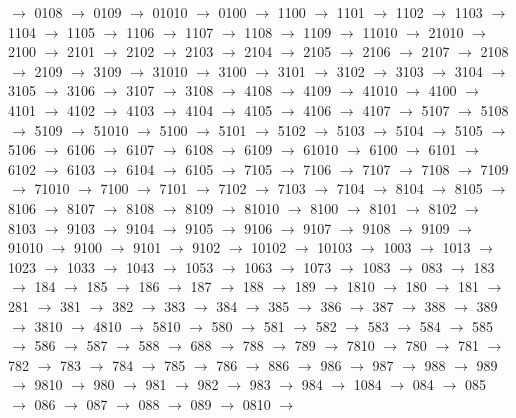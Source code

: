 $\rightarrow$ 0108 $\rightarrow$ 0109 $\rightarrow$ 01010 $\rightarrow$ 0100 $\rightarrow$ 1100 $\rightarrow$ 1101 $\rightarrow$ 1102 $\rightarrow$ 1103 $\rightarrow$ 1104 $\rightarrow$ 1105 $\rightarrow$ 1106 $\rightarrow$ 1107 $\rightarrow$ 1108 $\rightarrow$ 1109 $\rightarrow$ 11010 $\rightarrow$ 21010 $\rightarrow$ 2100 $\rightarrow$ 2101 $\rightarrow$ 2102 $\rightarrow$ 2103 $\rightarrow$ 2104 $\rightarrow$ 2105 $\rightarrow$ 2106 $\rightarrow$ 2107 $\rightarrow$ 2108 $\rightarrow$ 2109 $\rightarrow$ 3109 $\rightarrow$ 31010 $\rightarrow$ 3100 $\rightarrow$ 3101 $\rightarrow$ 3102 $\rightarrow$ 3103 $\rightarrow$ 3104 $\rightarrow$ 3105 $\rightarrow$ 3106 $\rightarrow$ 3107 $\rightarrow$ 3108 $\rightarrow$ 4108 $\rightarrow$ 4109 $\rightarrow$ 41010 $\rightarrow$ 4100 $\rightarrow$ 4101 $\rightarrow$ 4102 $\rightarrow$ 4103 $\rightarrow$ 4104 $\rightarrow$ 4105 $\rightarrow$ 4106 $\rightarrow$ 4107 $\rightarrow$ 5107 $\rightarrow$ 5108 $\rightarrow$ 5109 $\rightarrow$ 51010 $\rightarrow$ 5100 $\rightarrow$ 5101 $\rightarrow$ 5102 $\rightarrow$ 5103 $\rightarrow$ 5104 $\rightarrow$ 5105 $\rightarrow$ 5106 $\rightarrow$ 6106 $\rightarrow$ 6107 $\rightarrow$ 6108 $\rightarrow$ 6109 $\rightarrow$ 61010 $\rightarrow$ 6100 $\rightarrow$ 6101 $\rightarrow$ 6102 $\rightarrow$ 6103 $\rightarrow$ 6104 $\rightarrow$ 6105 $\rightarrow$ 7105 $\rightarrow$ 7106 $\rightarrow$ 7107 $\rightarrow$ 7108 $\rightarrow$ 7109 $\rightarrow$ 71010 $\rightarrow$ 7100 $\rightarrow$ 7101 $\rightarrow$ 7102 $\rightarrow$ 7103 $\rightarrow$ 7104 $\rightarrow$ 8104 $\rightarrow$ 8105 $\rightarrow$ 8106 $\rightarrow$ 8107 $\rightarrow$ 8108 $\rightarrow$ 8109 $\rightarrow$ 81010 $\rightarrow$ 8100 $\rightarrow$ 8101 $\rightarrow$ 8102 $\rightarrow$ 8103 $\rightarrow$ 9103 $\rightarrow$ 9104 $\rightarrow$ 9105 $\rightarrow$ 9106 $\rightarrow$ 9107 $\rightarrow$ 9108 $\rightarrow$ 9109 $\rightarrow$ 91010 $\rightarrow$ 9100 $\rightarrow$ 9101 $\rightarrow$ 9102 $\rightarrow$ 10102 $\rightarrow$ 10103 $\rightarrow$ 1003 $\rightarrow$ 1013 $\rightarrow$ 1023 $\rightarrow$ 1033 $\rightarrow$ 1043 $\rightarrow$ 1053 $\rightarrow$ 1063 $\rightarrow$ 1073 $\rightarrow$ 1083 $\rightarrow$ 083 $\rightarrow$ 183 $\rightarrow$ 184 $\rightarrow$ 185 $\rightarrow$ 186 $\rightarrow$ 187 $\rightarrow$ 188 $\rightarrow$ 189 $\rightarrow$ 1810 $\rightarrow$ 180 $\rightarrow$ 181 $\rightarrow$ 281 $\rightarrow$ 381 $\rightarrow$ 382 $\rightarrow$ 383 $\rightarrow$ 384 $\rightarrow$ 385 $\rightarrow$ 386 $\rightarrow$ 387 $\rightarrow$ 388 $\rightarrow$ 389 $\rightarrow$ 3810 $\rightarrow$ 4810 $\rightarrow$ 5810 $\rightarrow$ 580 $\rightarrow$ 581 $\rightarrow$ 582 $\rightarrow$ 583 $\rightarrow$ 584 $\rightarrow$ 585 $\rightarrow$ 586 $\rightarrow$ 587 $\rightarrow$ 588 $\rightarrow$ 688 $\rightarrow$ 788 $\rightarrow$ 789 $\rightarrow$ 7810 $\rightarrow$ 780 $\rightarrow$ 781 $\rightarrow$ 782 $\rightarrow$ 783 $\rightarrow$ 784 $\rightarrow$ 785 $\rightarrow$ 786 $\rightarrow$ 886 $\rightarrow$ 986 $\rightarrow$ 987 $\rightarrow$ 988 $\rightarrow$ 989 $\rightarrow$ 9810 $\rightarrow$ 980 $\rightarrow$ 981 $\rightarrow$ 982 $\rightarrow$ 983 $\rightarrow$ 984 $\rightarrow$ 1084 $\rightarrow$ 084 $\rightarrow$ 085 $\rightarrow$ 086 $\rightarrow$ 087 $\rightarrow$ 088 $\rightarrow$ 089 $\rightarrow$ 0810 $\rightarrow$ 
